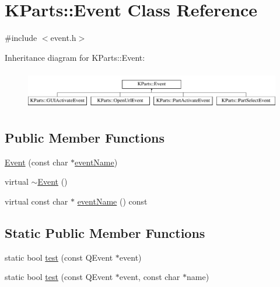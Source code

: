 \hypertarget{classKParts_1_1Event}{\section{\-K\-Parts\-:\-:\-Event \-Class \-Reference}
\label{classKParts_1_1Event}
}


{\ttfamily \#include $<$event.\-h$>$}

\-Inheritance diagram for \-K\-Parts\-:\-:\-Event\-:\begin{figure}[H]
\begin{center}
\leavevmode
\includegraphics[height=1.707317cm]{classKParts_1_1Event}
\end{center}
\end{figure}
\subsection*{\-Public \-Member \-Functions}
\begin{DoxyCompactItemize}
\item 
\hyperlink{classKParts_1_1Event_af717e4320e2db1ab5973c41381673a4e}{\-Event} (const char $\ast$\hyperlink{classKParts_1_1Event_aefe2f55deef3f5ffc2de198b955fc453}{event\-Name})
\item 
virtual \hyperlink{classKParts_1_1Event_a5e19e5a883bb39c0ea6053170af67081}{$\sim$\-Event} ()
\item 
virtual const char $\ast$ \hyperlink{classKParts_1_1Event_aefe2f55deef3f5ffc2de198b955fc453}{event\-Name} () const 
\end{DoxyCompactItemize}
\subsection*{\-Static \-Public \-Member \-Functions}
\begin{DoxyCompactItemize}
\item 
static bool \hyperlink{classKParts_1_1Event_a825b18534ae37dae24f2a2b326db0629}{test} (const \-Q\-Event $\ast$event)
\item 
static bool \hyperlink{classKParts_1_1Event_a1736144deda3cbb502cb6a9151d3c7cb}{test} (const \-Q\-Event $\ast$event, const char $\ast$name)
\end{DoxyCompactItemize}


